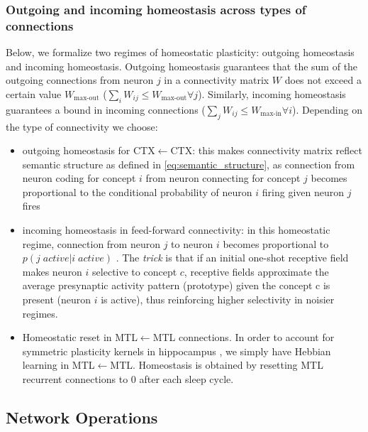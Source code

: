 \documentclass{article}
\begin{document}
\subsubsection*{Outgoing and incoming homeostasis across types of connections}
Below, we formalize two regimes of homeostatic plasticity: outgoing homeostasis and incoming homeostasis. Outgoing homeostasis guarantees that the sum of the outgoing connections from neuron $j$ in a connectivity matrix $W$ does not exceed a certain value $W_\textrm{max-out}$ ($\sum_iW_{ij} \leq W_\textrm{max-out} \forall j$). Similarly, incoming homeostasis guarantees a bound in incoming connections ($\sum_jW_{ij} \leq W_\textrm{max-in} \forall i$). Depending on the type of connectivity we choose:
\begin{itemize}
    \item outgoing homeostasis for CTX$\leftarrow$CTX: this makes connectivity matrix reflect semantic structure as defined in \eqref{eq:semantic_structure}, as connection from neuron coding for concept $i$ from neuron connecting for concept $j$ becomes proportional to the conditional probability of neuron $i$ firing given neuron $j$ fires 
    \item incoming homeostasis in feed-forward connectivity: in this homeostatic regime, connection from neuron $j$ to neuron $i$ becomes proportional to $p(j \; \textit{active} | i\; \textit{active})$ . The \textit{trick} is that if an initial one-shot receptive field makes neuron $i$ selective to concept $c$, receptive fields approximate the average presynaptic activity pattern (prototype) given the concept c is present (neuron $i$ is active), thus reinforcing higher selectivity in noisier regimes.
    \item Homeostatic reset in MTL$\leftarrow$MTL connections. In order to account for symmetric plasticity kernels in hippocampus , we simply have Hebbian learning in MTL$\leftarrow$MTL. Homeostasis is obtained by resetting MTL recurrent connections to 0 after each sleep cycle.
\end{itemize}
\subsection*{Network Operations}
\end{document}
